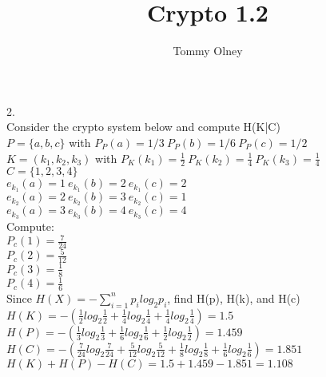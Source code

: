 \documentclass{article}
\begin{document}
\title{Crypto 1.2}
\author{Tommy Olney}
\date{}


2.\\
Consider the crypto system below and compute H(K|C)\\
$P=\{ a,b,c \}$ with $P_P(a)=1/3\ P_P(b)=1/6\ P_P(c)=1/2$\\
$K = (k_1,k_2,k_3)$ with $P_K(k_1)=\frac{1}{2}\ P_K(k_2)=\frac{1}{4}\ P_K(k_3)=\frac{1}{4}$\\
$C = \{1,2,3,4\}$\\
$e_{k_1}(a)=1\ e_{k_1}(b)=2\ e_{k_1}(c)=2$\\
$e_{k_2}(a)=2\ e_{k_2}(b)=3\ e_{k_2}(c)=1$\\
$e_{k_3}(a)=3\ e_{k_3}(b)=4\ e_{k_3}(c)=4$\\

Compute:\\
$P_c(1) = \frac{7}{24}$\\
$P_c(2) = \frac{5}{12}$\\
$P_c(3) = \frac{1}{8}$\\
$P_c(4) = \frac{1}{6}$\\
Since $H(X) = - \sum\limits_{i=1}^{n}p_ilog_2p_i$, find H(p), H(k), and H(c) \\
$H(K) = -(\frac{1}{2}log_2\frac{1}{2}+\frac{1}{4}log_2\frac{1}{4}+\frac{1}{4}log_2\frac{1}{4}) = 1.5$\\
$H(P) = -(\frac{1}{3}log_2\frac{1}{3}+\frac{1}{6}log_2\frac{1}{6}+\frac{1}{2}log_2\frac{1}{2}) = 1.459$\\
$H(C) = -(\frac{7}{24}log_2\frac{7}{24}+\frac{5}{12}log_2\frac{5}{12}+\frac{1}{8}log_2\frac{1}{8}+\frac{1}{6}log_2\frac{1}{6}) = 1.851$\\
$H(K)+H(P)-H(C) = 1.5+1.459-1.851 = 1.108$\\
\end{document}
